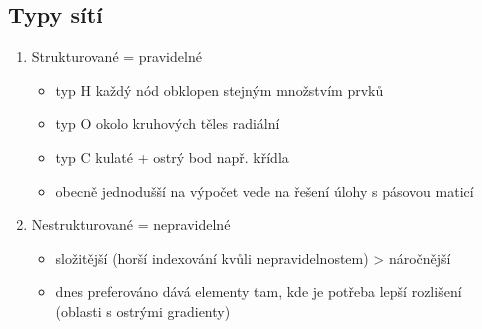 \documentclass[letterpaper,10pt,czech]{sphinxmanual}
\begin{document}
\subsection{Typy sítí}
\label{\detokenize{prednaska_23092022:typy-siti}}\begin{enumerate}
%
\item {} 
\sphinxAtStartPar
Strukturované = pravidelné
\begin{itemize}
\item {} 
\sphinxAtStartPar
typ H \sphinxhyphen{} každý nód obklopen stejným množstvím prvků

\item {} 
\sphinxAtStartPar
typ O \sphinxhyphen{} okolo kruhových těles \sphinxhyphen{} radiální

\item {} 
\sphinxAtStartPar
typ C \sphinxhyphen{} kulaté + ostrý bod \sphinxhyphen{} např. křídla

\item {} 
\sphinxAtStartPar
obecně jednodušší na výpočet \sphinxhyphen{} vede na řešení úlohy s pásovou maticí

\end{itemize}

\item {} 
\sphinxAtStartPar
Nestrukturované = nepravidelné
\begin{itemize}
\item {} 
\sphinxAtStartPar
složitější (horší indexování kvůli nepravidelnostem) \sphinxhyphen{}\textgreater{} náročnější

\item {} 
\sphinxAtStartPar
dnes preferováno \textendash{} dává elementy tam, kde je potřeba lepší rozlišení (oblasti s ostrými gradienty)

\end{itemize}

\end{enumerate}
\end{document}
